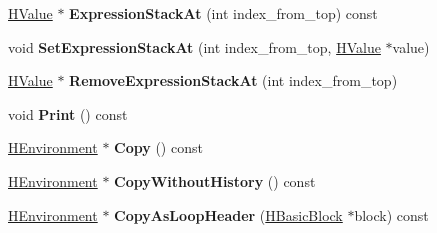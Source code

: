 \begin{DoxyCompactItemize}
\item 
\hyperlink{classv8_1_1internal_1_1_h_value}{H\+Value} $\ast$ {\bfseries Expression\+Stack\+At} (int index\+\_\+from\+\_\+top) const \hypertarget{classv8_1_1internal_1_1_h_environment_a2a182937fa804ac338ae2340cbd96140}{}\label{classv8_1_1internal_1_1_h_environment_a2a182937fa804ac338ae2340cbd96140}

\item 
void {\bfseries Set\+Expression\+Stack\+At} (int index\+\_\+from\+\_\+top, \hyperlink{classv8_1_1internal_1_1_h_value}{H\+Value} $\ast$value)\hypertarget{classv8_1_1internal_1_1_h_environment_a26e41b8a3c012af31bba4a10035a90cd}{}\label{classv8_1_1internal_1_1_h_environment_a26e41b8a3c012af31bba4a10035a90cd}

\item 
\hyperlink{classv8_1_1internal_1_1_h_value}{H\+Value} $\ast$ {\bfseries Remove\+Expression\+Stack\+At} (int index\+\_\+from\+\_\+top)\hypertarget{classv8_1_1internal_1_1_h_environment_a6118a0cdacd76ea001fce4b8ca4596b7}{}\label{classv8_1_1internal_1_1_h_environment_a6118a0cdacd76ea001fce4b8ca4596b7}

\item 
void {\bfseries Print} () const \hypertarget{classv8_1_1internal_1_1_h_environment_a9549ab5e58aa38985b3d9bb8f11942a4}{}\label{classv8_1_1internal_1_1_h_environment_a9549ab5e58aa38985b3d9bb8f11942a4}

\item 
\hyperlink{classv8_1_1internal_1_1_h_environment}{H\+Environment} $\ast$ {\bfseries Copy} () const \hypertarget{classv8_1_1internal_1_1_h_environment_ac03129d0e584eec642fa1f3cef58f0b5}{}\label{classv8_1_1internal_1_1_h_environment_ac03129d0e584eec642fa1f3cef58f0b5}

\item 
\hyperlink{classv8_1_1internal_1_1_h_environment}{H\+Environment} $\ast$ {\bfseries Copy\+Without\+History} () const \hypertarget{classv8_1_1internal_1_1_h_environment_aa575c200b72d5fd89e72d96d54725fa8}{}\label{classv8_1_1internal_1_1_h_environment_aa575c200b72d5fd89e72d96d54725fa8}

\item 
\hyperlink{classv8_1_1internal_1_1_h_environment}{H\+Environment} $\ast$ {\bfseries Copy\+As\+Loop\+Header} (\hyperlink{classv8_1_1internal_1_1_h_basic_block}{H\+Basic\+Block} $\ast$block) const \hypertarget{classv8_1_1internal_1_1_h_environment_a4f8908bfac660991c8d20e8ae6d7c222}{}\label{classv8_1_1internal_1_1_h_environment_a4f8908bfac660991c8d20e8ae6d7c222}


\end{DoxyCompactItemize}
